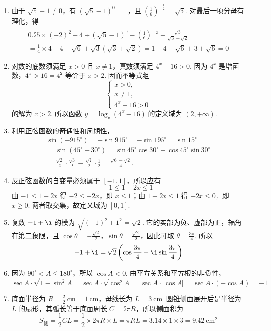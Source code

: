 \begin{solution}
\begin{enumerate}
\item 由于 \(\sqrt{5}-1\neq0\)，有 \(\left(\sqrt{5}-1\right)^0=1\)，且 \(\left(\frac{1}{6}\right)^{-\frac{1}{2}}=\sqrt{6}\). 对最后一项分母有理化，得
\[
\begin{gathered}
0.25\times\left(-2\right)^2-4\div\left(\sqrt{5}-1\right)^0-\left(\frac{1}{6}\right)^{-\frac{1}{2}}+\frac{\sqrt{3}}{\sqrt{3}-\sqrt{2}} \\
=\frac{1}{4}\times4-4-\sqrt{6}+\sqrt{3}\left(\sqrt{3}+\sqrt{2}\right)
=1-4-\sqrt{6}+3+\sqrt{6}=0
\end{gathered}
\]

\item 对数的底数须满足 \(x>0\) 且 \(x\neq1\)，真数须满足 \(4^x-16>0\). 因为 \(4^x\) 是增函数，\(4^x>16=4^2\) 等价于 \(x>2\). 因而不等式组
\[
\begin{cases}
x>0,\\
x\neq1,\\
4^x-16>0
\end{cases}
\]
的解为 \(x>2\). 所以函数 \(y=\log_x\left(4^x-16\right)\) 的定义域为 \(\left(2,+\infty\right)\).

\item 利用正弦函数的奇偶性和周期性，
\[
\begin{gathered}
\sin\left(-915^\circ\right)=-\sin915^\circ=-\sin195^\circ=\sin15^\circ \\
=\sin\left(45^\circ-30^\circ\right)
=\sin45^\circ\cos30^\circ-\cos45^\circ\sin30^\circ \\
=\frac{\sqrt{2}}{2}\cdot\frac{\sqrt{3}}{2}-\frac{\sqrt{2}}{2}\cdot\frac{1}{2}
=\frac{\sqrt{6}-\sqrt{2}}{4}.
\end{gathered}
\]

\item 反正弦函数的自变量必须属于 \(\left[-1,1\right]\)，所以应有
\[
-1\leqslant1-2x\leqslant1
\]
由 \(-1\leqslant1-2x\) 得 \(-2\leqslant-2x\)，即 \(x\leqslant1\)；由 \(1-2x\leqslant1\) 得 \(-2x\leqslant0\)，即 \(x\geqslant0\). 两者取交集，故定义域为 \(\left[0,1\right]\).

\item 复数 \(-1+\i\) 的模为 \(\sqrt{\left(-1\right)^2+1^2}=\sqrt{2}\). 它的实部为负、虚部为正，辐角在第二象限，且 \(\cos\theta=-\frac{\sqrt{2}}{2}\)，\(\sin\theta=\frac{\sqrt{2}}{2}\)，因此可取 \(\theta=\frac{3\pi}{4}\). 所以
\[
-1+\i=\sqrt{2}\left(\cos\frac{3\pi}{4}+\i\sin\frac{3\pi}{4}\right)
\]

\item 因为 \(90^\circ<A\leqslant180^\circ\)，所以 \(\cos A<0\). 由平方关系和平方根的非负性，
\[
\sec A\cdot\sqrt{1-\sin^2 A}
=\sec A\cdot\sqrt{\cos^2 A}
=\sec A\cdot\left|\cos A\right|
=\sec A\cdot\left(-\cos A\right)=-1
\]

\item 底面半径为 \(R=\frac{2}{2}\mathrm{~cm}=1\mathrm{~cm}\)，母线长为 \(L=3\mathrm{~cm}\). 圆锥侧面展开后是半径为 \(L\) 的扇形，其弧长等于底面周长 \(C=2\pi R\)，所以侧面积为
\[
S_{\text{侧}}=\frac{1}{2}CL=\frac{1}{2}\times2\pi R\times L=\pi RL=3.14\times1\times3=9.42\mathrm{~cm}^2
\]
\end{enumerate}
\end{solution}

